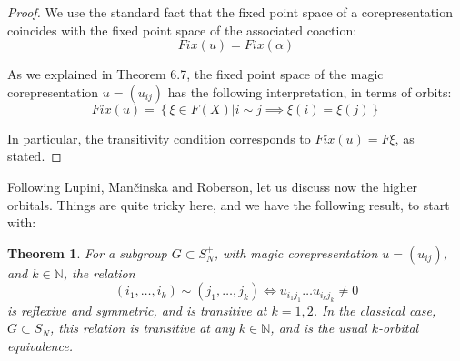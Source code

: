 \documentclass[12pt]{amsbook}
\newtheorem{theorem}{Theorem}[chapter]
\begin{document}
\begin{proof}
We use the standard fact that the fixed point space of a corepresentation coincides with the fixed point space of the associated coaction:
$$Fix(u)=Fix(\alpha)$$

As we explained in Theorem 6.7, the fixed point space of the magic corepresentation $u=(u_{ij})$ has the following interpretation, in terms of orbits:
$$Fix(u)=\left\{\xi\in F(X)\Big|i\sim j\implies \xi(i)=\xi(j)\right\}$$

In particular, the transitivity condition corresponds to $Fix(u)=F\xi$, as stated.
\end{proof}

Following Lupini, Man\v cinska and Roberson, let us discuss now the higher orbitals. Things are quite tricky here, and we have the following result, to start with:


\begin{theorem}
For a subgroup $G\subset S_N^+$, with magic corepresentation $u=(u_{ij})$, and $k\in\mathbb N$, the relation 
$$(i_1,\ldots,i_k)\sim(j_1,\ldots,j_k)\iff u_{i_1j_1}\ldots u_{i_kj_k}\neq0$$
is reflexive and symmetric, and is transitive at $k=1,2$. In the classical case, $G\subset S_N$, this relation is transitive at any $k\in\mathbb N$, and is the usual $k$-orbital equivalence.
\end{theorem}
\end{document}
